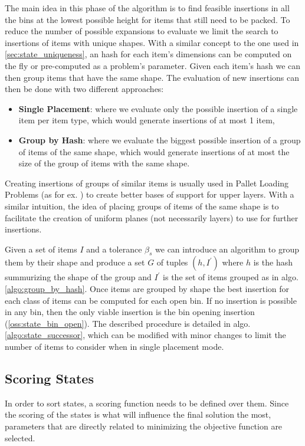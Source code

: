 The main idea in this phase of the algorithm is to find feasible insertions in all the bins at the lowest possible height for items that still need to be packed.
To reduce the number of possible expansions to evaluate we limit the search to insertions of items with unique shapes.
With a similar concept to the one used in \cref{sec:state_uniqueness}, an hash for each item's dimensions can be computed on the fly or pre-computed as a problem's parameter.
Given each item's hash we can then group items that have the same shape.
The evaluation of new insertions can then be done with two different approaches:
\begin{itemize}
    \label{def:placement_modes}%
    \item \textbf{Single Placement}: where we evaluate only the possible insertion of a single item per item type, which would generate insertions of at most 1 item,
    \item \textbf{Group by Hash}: where we evaluate the biggest possible insertion of a group of items of the same shape, which would generate insertions of at most the size of the group of items with the same shape.
\end{itemize}
Creating insertions of groups of similar items is usually used in Pallet Loading Problems (as for ex. \cite{elhedhli2019three}) to create better bases of support for upper layers.
With a similar intuition, the idea of placing groups of items of the same shape is to facilitate the creation of uniform planes (not necessarily layers) to use for further insertions.

Given a set of items $I$ and a tolerance $\beta_s$ we can introduce an algorithm to group them by their shape and produce a set $G$ of tuples $(h, I^\prime)$ where $h$ is the hash summurizing the shape of the group and $I^\prime$ is the set of items grouped as in algo. \ref{algo:group_by_hash}.
Once items are grouped by shape the best insertion for each class of items can be computed for each open bin. If no insertion is possible in any bin, then the only viable insertion is the bin opening insertion (\cref{oss:state_bin_open}).
The described procedure is detailed in algo. \ref{algo:state_successor}, which can be modified with minor changes to limit the number of items to consider when in single placement mode.





\subsection{Scoring States}
\label{ssec:scoring_states}%
In order to sort states, a scoring function needs to be defined over them.
Since the scoring of the states is what will influence the final solution the most, parameters that are directly related to minimizing the objective function are selected.

